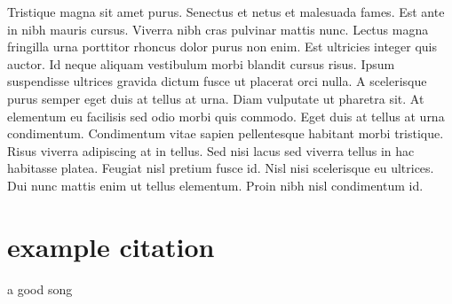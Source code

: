 \documentclass[15pt,a4paper]{article}
\begin{document}
Tristique magna sit amet purus. Senectus et netus et malesuada fames. Est ante in nibh mauris cursus. Viverra nibh cras pulvinar mattis nunc. Lectus magna fringilla urna porttitor rhoncus dolor purus non enim. Est ultricies integer quis auctor. Id neque aliquam vestibulum morbi blandit cursus risus. Ipsum suspendisse ultrices gravida dictum fusce ut placerat orci nulla. A scelerisque purus semper eget duis at tellus at urna. Diam vulputate ut pharetra sit. At elementum eu facilisis sed odio morbi quis commodo. Eget duis at tellus at urna condimentum. Condimentum vitae sapien pellentesque habitant morbi tristique. Risus viverra adipiscing at in tellus. Sed nisi lacus sed viverra tellus in hac habitasse platea. Feugiat nisl pretium fusce id. Nisl nisi scelerisque eu ultrices. Dui nunc mattis enim ut tellus elementum. Proin nibh nisl condimentum id.

\section{example citation}
a good song \autocite[1]{WEBSITE:1}
\newpage
\printbibliography{}
\end{document}
